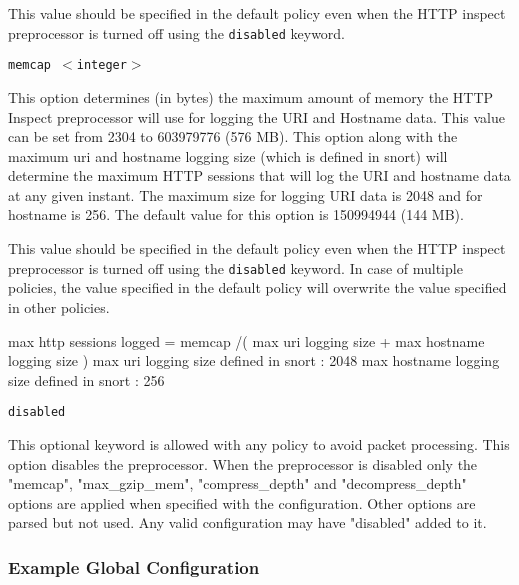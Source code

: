 \documentclass[english]{report}
\newcounter{slistnum}
\newenvironment{slist}
{ \begin{list}{ {\bf \arabic{slistnum}.} }{\usecounter{slistnum} } }
{ \end{list} }
\newenvironment{note}{
\samepage
    \vspace{10pt}{\textsf{
        {\hspace{7pt}\Huge{$\triangle$\hspace{-12.5pt}{\Large{$^!$}}}}\hspace{5pt}
        {\Large{NOTE}}
    }
    }
   \begin{center}
    \par\vspace{-17pt}

    \begin{lrbox}{\savepar}
    \begin{minipage}[r]{6in}
}
{
    \end{minipage}
    \end{lrbox}
    \fbox{
        \usebox{
            \savepar
	}
    }
    \par\vskip10pt
    \end{center}
}
\newenvironment{note}{
        \begin{rawhtml}
        <p><table border="1"><tr><td><b>
        Note:&nbsp;&nbsp;</b>
        \end{rawhtml}
}{
        \begin{rawhtml}
        </b></td></tr></table></p>
        \end{rawhtml}
}
\begin{document}
\begin{slist}
\begin{note}

This value should be specified in the default policy even when the HTTP inspect preprocessor is 
turned off using the \texttt{disabled} keyword.

\end{note}

\item \texttt{memcap $<$integer$>$}

This option determines (in bytes) the maximum amount of memory the HTTP Inspect preprocessor
will use for logging the URI and Hostname data. This value can be set from 2304 to 603979776 (576 MB).
This option along with the maximum uri and hostname logging size (which is defined in snort) will
determine the maximum HTTP sessions that will log the URI and hostname data at any given instant. The
maximum size for logging URI data is 2048 and for hostname is 256. The default value for this
option is 150994944 (144 MB).

\begin {note}

This value should be specified in the default policy even when the HTTP inspect preprocessor is turned off 
using the \texttt{disabled} keyword. In case of multiple policies, the value specified in the
default policy will overwrite the value specified in other policies.

max http sessions logged = memcap /( max uri logging size + max hostname logging size )
max uri logging size defined in snort : 2048
max hostname logging size defined in snort : 256

\end{note}

\item \texttt{disabled}

This optional keyword is allowed with any policy to avoid packet processing.
This option disables the preprocessor. When the preprocessor is disabled
only the "memcap", "max\_gzip\_mem", "compress\_depth" and "decompress\_depth" 
options are applied when specified with the configuration. Other options are
parsed but not used. Any valid configuration may have "disabled" added to it.

\end{slist}
\subsubsection{Example Global Configuration}
\end{document}

